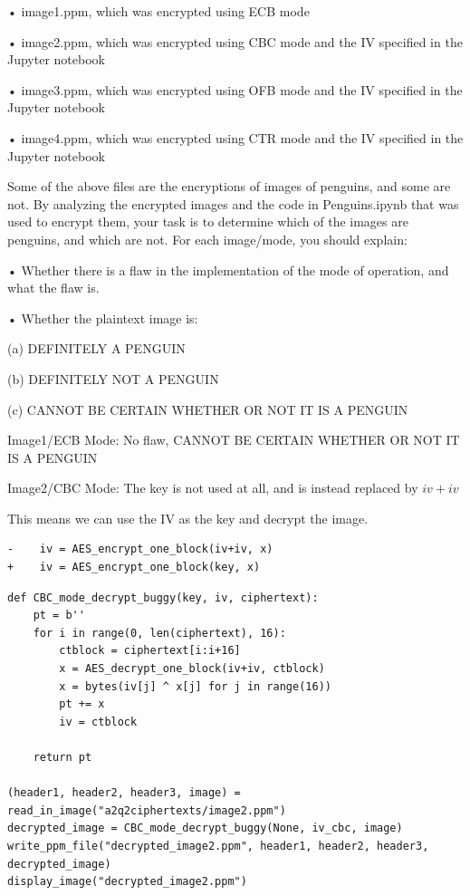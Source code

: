 \documentclass[11pt]{article}
\begin{document}
• image1.ppm, which was encrypted using ECB mode

• image2.ppm, which was encrypted using CBC mode and the IV speciﬁed in the Jupyter notebook

• image3.ppm, which was encrypted using OFB mode and the IV speciﬁed in the Jupyter notebook

• image4.ppm, which was encrypted using CTR mode and the IV speciﬁed in the Jupyter notebook

Some of the above ﬁles are the encryptions of images of penguins, and some are not. By analyzing the encrypted images and the code in Penguins.ipynb that was used to encrypt them, your task is to determine which of the images are penguins, and which are not. For each image/mode, you should explain:

• Whether there is a ﬂaw in the implementation of the mode of operation, and what the ﬂaw is.

• Whether the plaintext image is:

(a) DEFINITELY A PENGUIN

(b) DEFINITELY NOT A PENGUIN

(c) CANNOT BE CERTAIN WHETHER OR NOT IT IS A PENGUIN

Image1/ECB Mode: No flaw, CANNOT BE CERTAIN WHETHER OR NOT IT IS A PENGUIN

Image2/CBC Mode: The key is not used at all, and is instead replaced by $iv + iv$

This means we can use the IV as the key and decrypt the image.

\begin{verbatim}
-    iv = AES_encrypt_one_block(iv+iv, x)
+    iv = AES_encrypt_one_block(key, x)
\end{verbatim}

\begin{verbatim}
def CBC_mode_decrypt_buggy(key, iv, ciphertext):
    pt = b'' 
    for i in range(0, len(ciphertext), 16):
        ctblock = ciphertext[i:i+16]
        x = AES_decrypt_one_block(iv+iv, ctblock)
        x = bytes(iv[j] ^ x[j] for j in range(16))
        pt += x
        iv = ctblock

    return pt

(header1, header2, header3, image) = read_in_image("a2q2ciphertexts/image2.ppm")
decrypted_image = CBC_mode_decrypt_buggy(None, iv_cbc, image)
write_ppm_file("decrypted_image2.ppm", header1, header2, header3, decrypted_image)
display_image("decrypted_image2.ppm")
\end{verbatim}
\end{document}
